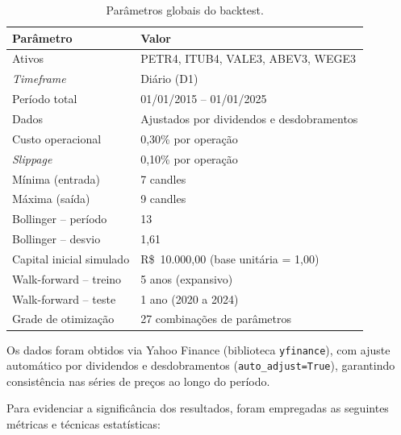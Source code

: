 \documentclass[a4paper,10pt]{article}
\begin{document}
\begin{table}[H]
\centering
\caption{Parâmetros globais do backtest.}
\label{tab:params}
\begin{tabular}{ll}
  \toprule
  \textbf{Parâmetro} & \textbf{Valor} \\
  \midrule
  Ativos & PETR4, ITUB4, VALE3, ABEV3, WEGE3 \\
  \textit{Timeframe} & Diário (D1) \\
  Período total & 01/01/2015 -- 01/01/2025 \\
  Dados & Ajustados por dividendos e desdobramentos \\
  Custo operacional & 0{,}30\% por operação \\
  \textit{Slippage} & 0{,}10\% por operação \\
  Mínima (entrada) & 7 candles \\
  Máxima (saída) & 9 candles \\
  Bollinger -- período & 13 \\
  Bollinger -- desvio & 1{,}61 \\
  Capital inicial simulado & R\$~10.000{,}00 (base unitária = 1{,}00) \\
  Walk-forward -- treino & 5 anos (expansivo) \\
  Walk-forward -- teste & 1 ano (2020 a 2024) \\
  Grade de otimização & 27 combinações de parâmetros \\
  \bottomrule
\end{tabular}
\end{table}

\noindent Os dados foram obtidos via Yahoo Finance (biblioteca \texttt{yfinance}), com ajuste automático por dividendos e desdobramentos (\texttt{auto\_adjust=True}), garantindo consistência nas séries de preços ao longo do período.

Para evidenciar a significância dos resultados, foram empregadas as seguintes métricas e técnicas estatísticas:
\end{document}
